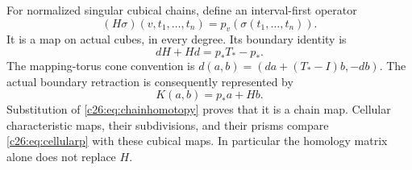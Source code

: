 For normalized singular cubical chains, define an interval-first operator
\begin{equation}\label{c26:eq:H}
(H\sigma)(v,t_1,\ldots,t_n)=p_v(\sigma(t_1,\ldots,t_n)).
\end{equation}
It is a map on actual cubes, in every degree. Its boundary identity is
\begin{equation}\label{c26:eq:chainhomotopy}
dH+Hd=p_*T_*-p_*.
\end{equation}
The mapping-torus cone convention is
$d(a,b)=(da+(T_*-I)b,-db)$.
The actual boundary retraction is consequently represented by
\begin{equation}\label{c26:eq:Kchain}
K(a,b)=p_*a+Hb.
\end{equation}
Substitution of \eqref{c26:eq:chainhomotopy} proves that it is a chain map.
Cellular characteristic maps, their subdivisions, and their prisms
compare \eqref{c26:eq:cellularp} with these cubical maps.
In particular the homology matrix alone does not replace $H$.

